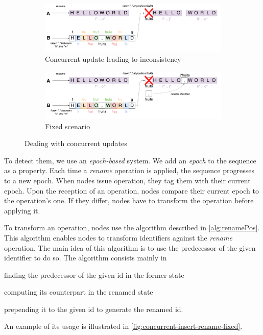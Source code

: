 \documentclass[sigplan,10pt]{acmart}
\begin{document}
\begin{figure}
    \centering
    \begin{subfigure}{\columnwidth}
        \includegraphics[width=0.9\columnwidth]{img/concurrent-insert-rename-inconsistent.png}
        \caption{Concurrent update leading to inconsistency}
        \label{fig:concurrent-insert-rename-inconsistent}
    \end{subfigure}
    \begin{subfigure}{\columnwidth}
        \includegraphics[width=0.9\columnwidth]{img/concurrent-insert-rename-fixed.png}
        \caption{Fixed scenario}
        \label{fig:concurrent-insert-rename-fixed}
    \end{subfigure}
    \caption{Dealing with concurrent updates}
    \label{fig:concurrent-insert-rename}
\end{figure}

To detect them, we use an \emph{epoch-based} system.
We add an \emph{epoch} to the sequence as a property.
Each time a \emph{rename} operation is applied, the sequence progresses to a new epoch.
When nodes issue operation, they tag them with their current epoch.
Upon the reception of an operation, nodes compare their current epoch to the operation's one.
If they differ, nodes have to transform the operation before applying it.

To transform an operation, nodes use the algorithm described in \autoref{alg:renamePos}.
This algorithm enables nodes to transform identifiers against the \emph{rename} operation.
The main idea of this algorithm is to use the predecessor of the given identifier to do so.
The algorithm consists mainly in
\begin{enumerate*}
    \item finding the predecessor of the given id in the former state
    \item computing its counterpart in the renamed state
    \item prepending it to the given id to generate the renamed id.
\end{enumerate*}
An example of its usage is illustrated in \autoref{fig:concurrent-insert-rename-fixed}.
\end{document}
